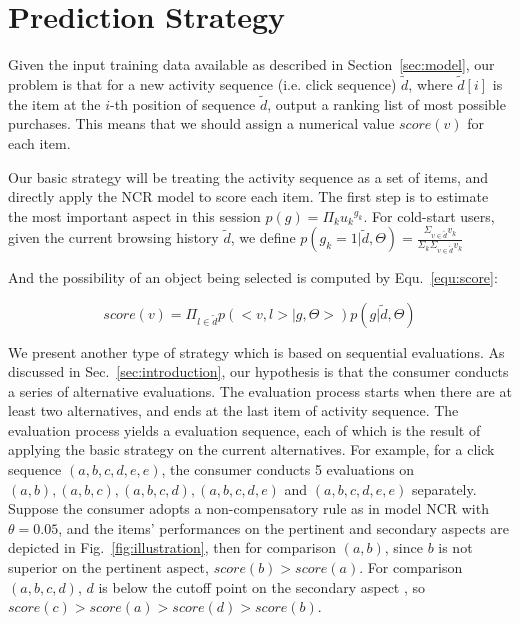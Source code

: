 \documentclass[sigconf]{acmart}
\begin{document}
\section{Prediction Strategy}\label{sec:strategy}

Given the input training data available as described in Section~\ref{sec:model}, our problem is that for a new activity sequence (i.e. click sequence) $\tilde{d}$,  where $\tilde{d}[i]$ is the item at the $i$-th position of sequence $\tilde{d}$,  output a ranking list of most possible purchases. This means that we should assign a numerical value $score(v)$ for each item. 
 
Our basic strategy will be treating the activity sequence as a set of items, and directly apply the NCR model to score each item.  The first step is to estimate the most important aspect  in this session $p(g)=\Pi_k {u_k}^{g_k} $. For cold-start users, given the current browsing history $\tilde{d}$, we define $p(g_k=1|\tilde{d},\Theta)=\frac{\Sigma_{v\in \tilde{d}} v_k}{\Sigma_k \Sigma_{v\in \tilde{d}} v_k}$

And the possibility of an object being selected is computed by Equ.~\ref{equ:score}: 

\begin{equation}\label{equ:score}
score(v)=\Pi_{l \in \tilde{d}} p(<v, l>|g,\Theta>)p(g|\tilde{d},\Theta)
\end{equation}

We present another type of strategy which is based on sequential evaluations. As discussed in Sec.~\ref{sec:introduction}, our hypothesis is that the consumer conducts a series of alternative evaluations. The evaluation process starts when there are at least two alternatives, and ends at the last item of activity sequence. The evaluation process yields a evaluation sequence, each of which is the result of applying the basic strategy on the current alternatives. For example, for a click sequence $(a,b,c,d,e,e)$, the consumer conducts 5 evaluations on $(a,b), (a,b,c), (a,b,c,d),(a,b,c,d,e)$ and $(a,b,c,d,e,e) $ separately. Suppose the consumer adopts a non-compensatory rule as in model NCR with $\theta=0.05$, and the items' performances on the pertinent and secondary aspects are depicted in Fig.~\ref{fig:illustration}, then for comparison $(a,b)$, since $b$ is not superior on the pertinent aspect, $score(b)>score(a)$. For comparison $(a,b,c,d)$,  $d$ is below the cutoff point on the secondary aspect , so $score(c)>score(a)>score(d)>score(b)$. 
\end{document}
